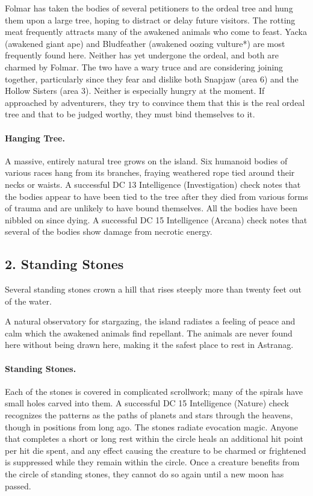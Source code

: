 \documentclass[10pt,a4paper,twoside,twocolumn,openany,bg=print,nodeprecatedcode]{dndbook}
\begin{document}
Folmar has taken the bodies of several petitioners to the ordeal tree and hung them upon a large tree, hoping to distract or delay future visitors. The rotting meat frequently attracts many of the awakened animals who come to feast.
Yacka (awakened giant ape) and Bludfeather (awakened oozing vulture*) are most frequently found here. Neither has yet undergone the ordeal, and both are charmed by Folmar. The two have a wary truce and are considering joining together, particularly since they fear and dislike both Snapjaw (area 6) and the Hollow Sisters (area 3). Neither is especially hungry at the moment. If approached by adventurers, they try to convince them that this is the real ordeal tree and that to be judged worthy, they must bind themselves to it.
\paragraph{Hanging Tree.}
A massive, entirely natural tree grows on the island. Six humanoid bodies of various races hang from its branches, fraying weathered rope tied around their necks or waists. A successful DC 13 Intelligence (Investigation) check notes that the bodies appear to have been tied to the tree after they died from various forms of trauma and are unlikely to have bound themselves. All the bodies have been nibbled on since dying. A successful DC 15 Intelligence (Arcana) check notes that several of the bodies show damage from necrotic energy.
\subsection{2. Standing Stones}
\begin{DndReadAloud}{}
Several standing stones crown a hill that rises steeply more than twenty feet out of the water.
\end{DndReadAloud}

A natural observatory for stargazing, the island radiates a feeling of peace and calm which the awakened animals find repellant. The animals are never found here without being drawn here, making it the safest place to rest in Astranag.
\paragraph{Standing Stones.}
Each of the stones is covered in complicated scrollwork; many of the spirals have small holes carved into them. A successful DC 15 Intelligence (Nature) check recognizes the patterns as the paths of planets and stars through the heavens, though in positions from long ago.
The stones radiate evocation magic. Anyone that completes a short or long rest within the circle heals an additional hit point per hit die spent, and any effect causing the creature to be charmed or frightened is suppressed while they remain within the circle. Once a creature benefits from the circle of standing stones, they cannot do so again until a new moon has passed.
\end{document}
